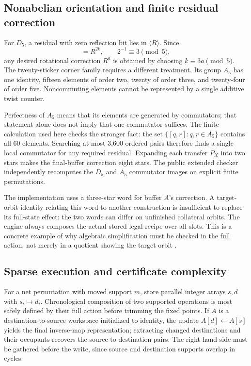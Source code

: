 \documentclass[a4paper,11pt]{article}
\begin{document}
\subsection{Nonabelian orientation and finite residual correction}

For \(D_5\), a residual with zero reflection bit lies in \(\langle R\rangle\). Since
\begin{equation}
[R^k,F]=R^{2k},\qquad 2^{-1}\equiv3\pmod5,
\label{eq:d5-correction}
\end{equation}
any desired rotational correction \(R^a\) is obtained by choosing \(k\equiv3a\pmod5\). The twenty-sticker corner family requires a different treatment. Its group \(A_5\) has one identity, fifteen elements of order two, twenty of order three, and twenty-four of order five. Noncommuting elements cannot be represented by a single additive twist counter.

Perfectness of \(A_5\) means that its elements are generated by commutators; that statement alone does not imply that one commutator suffices. The finite calculation used here checks the stronger fact: the set \(\{[q,r]:q,r\in A_5\}\) contains all 60 elements. Searching at most 3,600 ordered pairs therefore finds a single local commutator for any required residual. Expanding each transfer \(P_X\) into two stars makes the final-buffer correction eight stars. The public extended checker independently recomputes the \(D_5\) and \(A_5\) commutator images on explicit finite permutations.

The implementation uses a three-star word for buffer \(A\)'s correction. A target-orbit identity relating this word to another construction is insufficient to replace its full-state effect: the two words can differ on unfinished collateral orbits. The engine always composes the actual stored legal recipe over all slots. This is a concrete example of why algebraic simplification must be checked in the full action, not merely in a quotient showing the target orbit \cite{sourcecode,algorithms}.

\subsection{Sparse execution and certificate complexity}

For a net permutation with moved support \(m\), store parallel integer arrays \(s,d\) with \(s_i\mapsto d_i\). Chronological composition of two supported operations is most safely defined by their full action before trimming the fixed points. If \(A\) is a destination-to-source workspace initialized to identity, the update \(A[d]\leftarrow A[s]\) yields the final inverse-map representation; extracting changed destinations and their occupants recovers the source-to-destination pairs. The right-hand side must be gathered before the write, since source and destination supports overlap in cycles.
\end{document}

